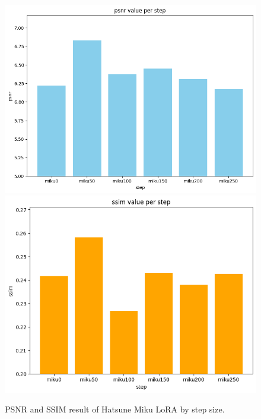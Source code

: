 \documentclass[extendedabs]{bmvc2k}
\begin{document}
\begin{figure}[t]
\centering
	\includegraphics[width=\linewidth]{images/miku-psnr.png}
    \includegraphics[width=\linewidth]{images/miku-ssim.png}
	\caption{
		PSNR and SSIM result of Hatsune Miku LoRA by step size.}
	\vspace{-2mm}
        \label{fig:mikuchart}
\end{figure}
\end{document}
